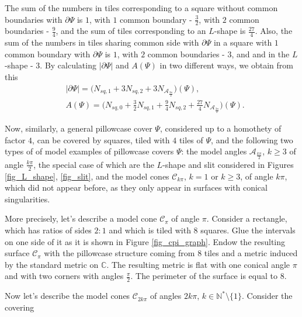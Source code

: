 \documentclass[12pt]{article}
\numberwithin{equation}{section}
\theoremstyle{theorem}
\theoremstyle{definition}
\theoremstyle{remark}
\newcommand{\comp}{\mathbb{C}}
\newcommand{\nat}{\mathbb{N}}
\begin{document}
	\par 
	The sum of the numbers in tiles corresponding to a square without common boundaries with $\partial \Psi$ is $1$, with $1$ common boundary - $\frac{3}{2}$, with $2$ common boundaries - $\frac{9}{4}$, and the sum of tiles corresponding to an $L$-shape is $\frac{27}{4}$.
	Also, the sum of the numbers in tiles sharing common side with $\partial \Psi$ in a square with $1$ common boundary with $\partial \Psi$ is $1$, with $2$ common boundaries - $3$, and and in the $L$-shape - $3$.
	By calculating $|\partial \Psi|$ and $A(\Psi)$ in two different ways, we obtain from this
	\begin{equation}\label{eq_count_areperim}
	\begin{aligned}
		&
		|\partial \Psi| = \Big( N_{sq, 1} + 3 N_{sq, 2} + 3 N_{\mathcal{A}_{\frac{3 \pi}{2}}} \Big) (\Psi),
		\\
		&
		A(\Psi) = \Big( N_{sq, 0} + \frac{3}{2} N_{sq, 1} + \frac{9}{4} N_{sq, 2} + \frac{27}{4} N_{\mathcal{A}_{\frac{3 \pi}{2}}} \Big) (\Psi).
	\end{aligned}
	\end{equation}
	\par 
	Now, similarly, a general pillowcase cover $\Psi$, considered up to a homothety of factor $4$, can be covered by squares, tiled with $4$ tiles of $\Psi$, and the following two types of of model examples of pillowcase covers $\Psi$: the model angles $\mathcal{A}_{\frac{k \pi}{2}}$, $k \geq 3$ of angle $\frac{k \pi}{2}$, the special case of which are the $L$-shape and slit considered in Figures \ref{fig_L_shape}, \ref{fig_slit}, and the model cones $\mathcal{C}_{k \pi}$, $k = 1$ or $k \geq 3$, of angle $k \pi$, which did not appear before, as they only appear in surfaces with conical singularities.
	\par 
	More precisely, let's describe a model cone $\mathcal{C}_{\pi}$ of angle $\pi$.
	Consider a rectangle, which has ratios of sides $2 : 1$ and which is tiled with $8$ squares.
	Glue the intervals on one side of it as it is shown in Figure \ref{fig_cpi_graph}.
	Endow the resulting surface $\mathcal{C}_{\pi}$ with the pillowcase structure coming from $8$ tiles and a metric induced by the standard metric on $\comp$.
	The resulting metric is flat with one conical angle $\pi$ and with two corners with angles $\frac{\pi}{2}$.
	The perimeter of the surface is equal to $8$.
	\par Now let's describe the model cones $\mathcal{C}_{2k\pi}$ of angles $2k\pi$, $k \in \nat^* \setminus \{1\}$.
	Consider the covering 
\end{document}
